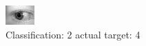 \begin{figure}[h!]
\begin{center}
\includegraphics[width=0.60\columnwidth]{figures/ID830_class_2_target_4.png}
\end{center}
\caption{ Classification: 2 actual target: 4}
\label{fig:ID830_class_2_target_4}
\end{figure}
